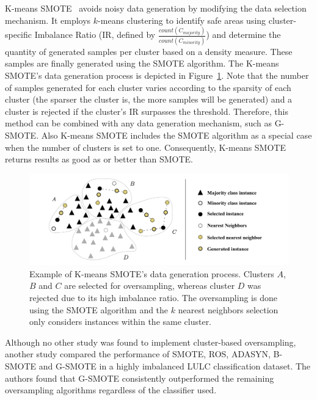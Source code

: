 \documentclass[authoryear,preprint,12pt]{elsarticle}
\begin{document}
\begin{linenumbers}
K-means SMOTE~\citep{Douzas2018} avoids noisy data
generation by modifying the data selection mechanism. It employs $k$-means
clustering to identify safe areas using cluster-specific Imbalance Ratio
(IR, defined by $\frac{count(C_{majority})}{count(C_{minority})}$) and
determine the quantity of generated samples per cluster based on a density
measure. These samples are finally generated using the SMOTE algorithm. The
K-means SMOTE's data generation process is depicted in
Figure~\ref{fig:kmeans_smote_example}. Note that the number of samples
generated for each cluster varies according to the sparsity of each cluster
(the sparser the cluster is, the more samples will be generated) and a cluster
is rejected if the cluster's IR surpasses the threshold.  Therefore, this
method can be combined with any data generation mechanism, such as G-SMOTE.
Also K-means SMOTE includes the SMOTE algorithm as a
special case when the number of clusters is set to one. Consequently,
K-means SMOTE returns
results as good as or better than SMOTE.

\begin{figure}[H]
	\centering
    \captionsetup{justification=centering}
    \caption{Example of K-means SMOTE's data generation
        process. Clusters $A$, $B$ and $C$ are selected for oversampling,
        whereas cluster $D$ was rejected due to its high imbalance ratio. The
        oversampling is done using the SMOTE algorithm and the $k$ nearest
        neighbors selection only considers instances
        within the same cluster.
    \vspace{.2cm}}
	\label{fig:kmeans_smote_example}
	\includegraphics[width=1\linewidth]{../analysis/kmeans_smote_example}
\end{figure}

Although no other study was found to implement cluster-based oversampling,
another study \citep{Douzas2019rs} compared the performance of SMOTE, ROS,
ADASYN, B-SMOTE and G-SMOTE in a highly imbalanced LULC classification dataset.
The authors found that G-SMOTE consistently outperformed the remaining
oversampling algorithms regardless of the classifier used.


\end{linenumbers}
\end{document}
